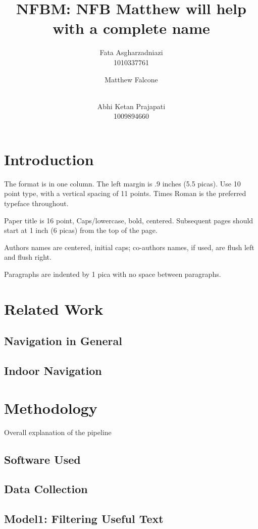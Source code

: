 \documentclass[a4paper]{article}
\title{NFBM: NFB Matthew will help with a complete name }
\author{
Fata Asgharzadniazi \\ 1010337761\\
\and
Matthew Falcone \\ \\
\and
Abhi Ketan Prajapati \\ 1009894660 \\
}
\begin{document}
\maketitle

\begin{abstract}
\end{abstract}


\section{Introduction}

The format is in one column. The left margin is .9 inches (5.5 picas). Use 10 point type,
with a vertical spacing of 11 points. Times Roman is the preferred
typeface throughout.

Paper title is 16 point, Caps/lowercase, bold, centered. Subsequent
pages should start at 1 inch (6 picas) from the top of the page.

Authors names are centered, initial caps; co-authors names, if used, are
flush left and flush right.

Paragraphs are indented by 1 pica with no space between paragraphs.

\section{Related Work}
\subsection{Navigation in General}

\subsection{Indoor Navigation}

\section{Methodology}
Overall explanation of the pipeline
\subsection{Software Used}

\subsection{Data Collection}

\subsection{Model1: Filtering Useful Text}
\end{document}
